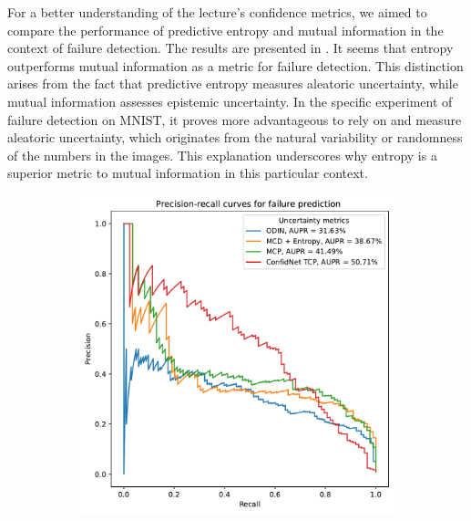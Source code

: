 For a better understanding of the lecture's confidence metrics, we aimed to compare the performance of predictive entropy and mutual information in the context of failure detection. The results are presented in . It seems that entropy outperforms mutual information as a metric for failure detection. This distinction arises from the fact that predictive entropy measures aleatoric uncertainty, while mutual information assesses epistemic uncertainty. In the specific experiment of failure detection on MNIST, it proves more advantageous to rely on and measure aleatoric uncertainty, which originates from the natural variability or randomness of the numbers in the images. This explanation underscores why entropy is a superior metric to mutual information in this particular context.
\begin{figure}[H]
    \centering
    \begin{subfigure}{0.45\textwidth}
        \includegraphics[width=\textwidth]{failure_aupr.pdf}
        \caption{}
        \label{fig:failure_aupr}
    \end{subfigure}%
    \begin{subfigure}{0.45\textwidth}

\end{subfigure}
\end{figure}
